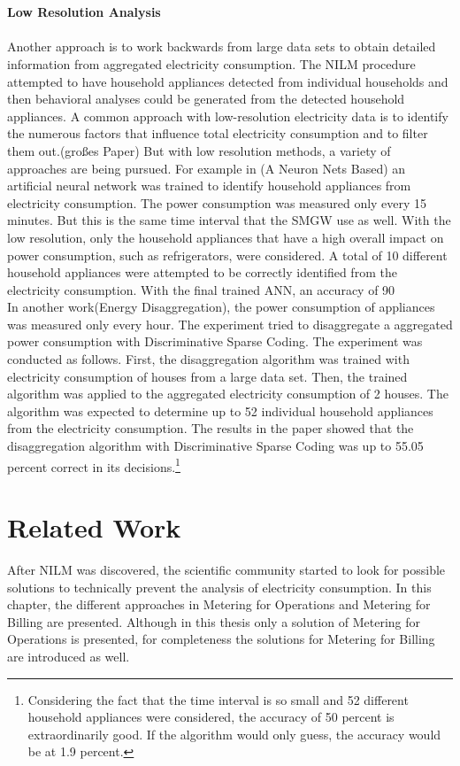 \\
\\
\textbf{Low Resolution Analysis}
\\
\\Another approach is to work backwards from large data sets to obtain detailed information from aggregated electricity consumption. The NILM procedure attempted to have household appliances detected from individual households and then behavioral analyses could be generated from the detected household appliances. A common approach with low-resolution electricity data is to identify the numerous factors that influence total electricity consumption and to filter them out.(großes Paper) 
But with low resolution methods, a variety of approaches are being pursued.
For example in (A Neuron Nets Based) an artificial neural network was trained to identify household appliances from electricity consumption. The power consumption was measured only every 15 minutes. But this is the same time interval that the SMGW use as well. With the low resolution, only the household appliances that have a high overall impact on power consumption, such as refrigerators, were considered. A total of 10 different household appliances were attempted to be correctly identified from the electricity consumption. With the final trained ANN, an accuracy of 90%
\\%
In another work(Energy Disaggregation), the power consumption of appliances was measured only every hour. The experiment tried to disaggregate a aggregated power consumption with Discriminative Sparse Coding. The experiment was conducted as follows. First, the disaggregation algorithm was trained with electricity consumption of houses from a large data set. Then, the trained algorithm was applied to the aggregated electricity consumption of 2 houses. The algorithm was expected to determine up to 52 individual household appliances from the electricity consumption. The results in the paper showed that the disaggregation algorithm with Discriminative Sparse Coding was up to 55.05 percent correct in its decisions.\footnote[1]{Considering the fact that the time interval is so small and 52 different household appliances were considered, the accuracy of 50 percent is extraordinarily good. If the algorithm would only guess, the accuracy would be at 1.9 percent.}

\section{Related Work}
After NILM was discovered, the scientific community started to look for possible solutions to technically prevent the analysis of electricity consumption. In this chapter, the different approaches in Metering for Operations and Metering for Billing are presented. Although in this thesis only a solution of Metering for Operations is presented, for completeness the solutions for Metering for Billing are introduced as well.
